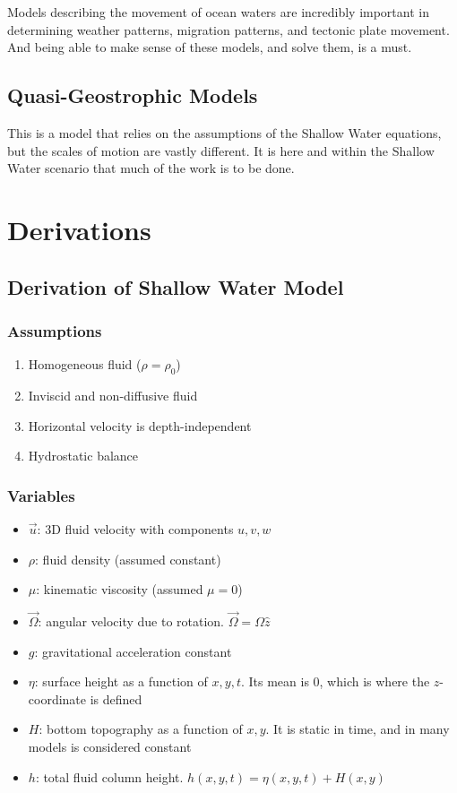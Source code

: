 \documentclass[12pt, twoside, letterpaper]{article}
\begin{document}
Models describing the movement of ocean waters are incredibly important in determining weather patterns, migration patterns, and tectonic plate movement. And being able to make sense of these models, and solve them, is a must.

\subsection{Quasi-Geostrophic Models}
This is a model that relies on the assumptions of the Shallow Water equations, but the scales of motion are vastly different. It is here and within the Shallow Water scenario that much of the work is to be done.

\section{Derivations}
\subsection{Derivation of Shallow Water Model}
\subsubsection{Assumptions}
\begin{enumerate}
	\item Homogeneous fluid ($\rho = \rho_0$)
	\item Inviscid and non-diffusive fluid
	\item Horizontal velocity is depth-independent
	\item Hydrostatic balance
\end{enumerate}

\subsubsection{Variables}
\begin{itemize}
	\item $\vec u$: 3D fluid velocity with components $u, v, w$
	\item $\rho$: fluid density (assumed constant)
	\item $\mu$: kinematic viscosity (assumed $\mu = 0$)
	\item $\vec \Omega$: angular velocity due to rotation. $\vec \Omega = \Omega \hat z$
	\item $g$: gravitational acceleration constant
	\item $\eta$: surface height as a function of $x, y, t$. Its mean is 0, which is where the $z$-coordinate is defined
	\item $H$: bottom topography as a function of $x, y$. It is static in time, and in many models is considered constant
	\item $h$: total fluid column height. $h(x,y,t) = \eta(x,y,t) + H(x,y)$
\end{itemize}
\end{document}
